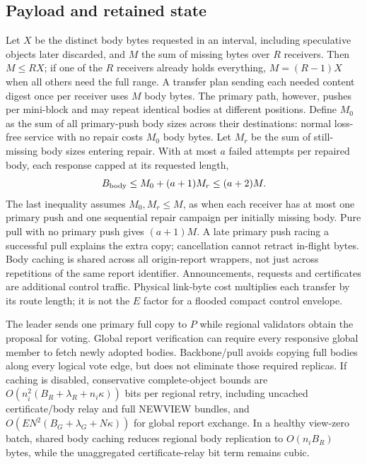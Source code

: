 \documentclass[11pt,a4paper,onecolumn]{article}
\theoremstyle{remark}\newtheorem{example}[definition]{Example}
\begin{document}
\subsection{Payload and retained state}\label{sec:payloadcost}
Let $X$ be the distinct body bytes requested in an interval, including speculative
objects later discarded, and $M$ the sum of missing bytes over $R$ receivers.
Then $M\leq RX$; if one of the $R$ receivers already holds everything,
$M=(R-1)X$ when all others need the full range. A transfer plan sending each
needed content digest once per receiver uses $M$ body bytes. The primary path,
however, pushes per mini-block and may repeat identical bodies at different
positions. Define $M_0$ as the sum of all primary-push body sizes across their
destinations: normal loss-free service with no repair costs $M_0$ body bytes.
Let $M_r$ be the sum of still-missing
body sizes entering repair. With at most $a$ failed attempts per repaired body,
each response capped at its requested length,
\begin{equation}\label{eq:payload}
 B_{\rm body}\leq M_0+(a+1)M_r\leq(a+2)M.
\end{equation}
The last inequality assumes $M_0,M_r\leq M$, as when each receiver has at most
one primary push and one sequential repair campaign per initially missing body.
Pure pull with no primary push gives $(a+1)M$. A late primary push racing a
successful pull explains the extra copy; cancellation cannot retract in-flight
bytes. Body caching is shared across all origin-report wrappers, not just
across repetitions of the same report identifier.
Announcements, requests and certificates are additional control traffic.
Physical link-byte cost multiplies each transfer by its route length; it is
not the $E$ factor for a flooded compact control envelope.

The leader sends one primary full copy to $P$ while regional validators obtain
the proposal for voting. Global report verification can require every responsive
global member to fetch newly adopted bodies. Backbone/pull avoids copying full
bodies along every logical vote edge, but does not eliminate those required
replicas. If caching is disabled, conservative complete-object bounds are
$O(n_i^2(B_R+\lambda_R+n_i\kappa))$ bits per regional retry, including
uncached certificate/body relay and full NEWVIEW bundles, and
$O(EN^2(B_G+\lambda_G+N\kappa))$ for global report exchange. In a healthy view-zero
batch, shared body caching reduces regional body replication to $O(n_iB_R)$
bytes, while the unaggregated certificate-relay bit term remains cubic.
\end{document}
